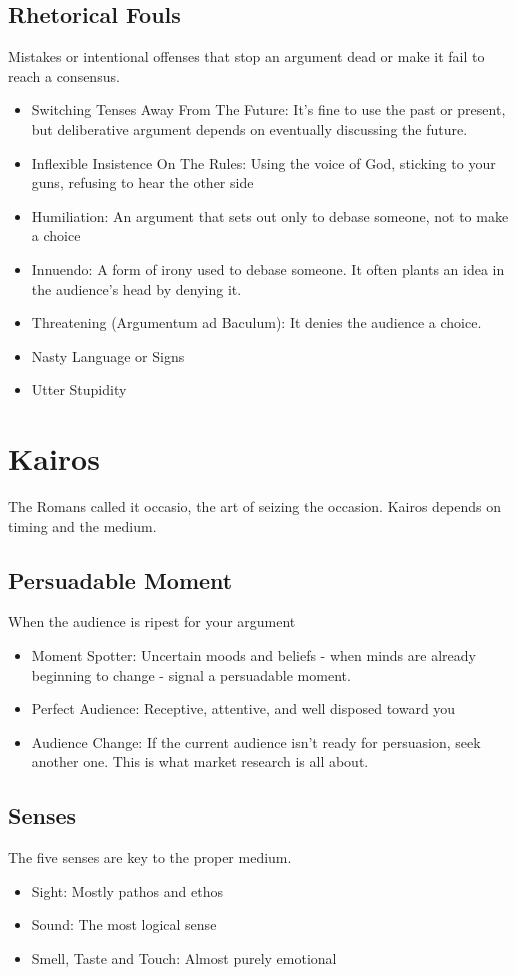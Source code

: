 \subsection{Rhetorical Fouls}
Mistakes or intentional offenses that stop an argument dead or make it fail to reach a consensus.
\begin{itemize}
	\item Switching Tenses Away From The Future: It's fine to use the past or present, but deliberative argument depends on eventually discussing the future.
	\item Inflexible Insistence On The Rules: Using the voice of God, sticking to your guns, refusing to hear the other side
	\item Humiliation: An argument that sets out only to debase someone, not to make a choice
	\item Innuendo: A form of irony used to debase someone. It often plants an idea in the audience's head by denying it.
	\item Threatening (Argumentum ad Baculum): It denies the audience a choice.
	\item Nasty Language or Signs
	\item Utter Stupidity
\end{itemize}

\section{Kairos}
The Romans called it occasio, the art of seizing the occasion. Kairos depends on timing and the medium.

\subsection{Persuadable Moment}
When the audience is ripest for your argument
\begin{itemize}
	\item Moment Spotter: Uncertain moods and beliefs - when minds are already beginning to change - signal a persuadable moment.
	\item Perfect Audience: Receptive, attentive, and well disposed toward you
	\item Audience Change: If the current audience isn't ready for persuasion, seek another one. This is what market research is all about.
\end{itemize}

\subsection{Senses}
The five senses are key to the proper medium.
\begin{itemize}
	\item Sight: Mostly pathos and ethos
	\item Sound: The most logical sense
	\item Smell, Taste and Touch: Almost purely emotional
\end{itemize}

